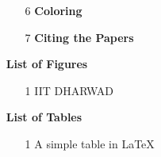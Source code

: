 \documentclass[12pt,a4paper]{article}
\begin{document}
\begin{itemize}
\begin{enumerate}
			\item[6] \textbf{Coloring} 
			\item[7] \textbf{Citing the Papers} 
		\end{enumerate}
		\item[] \textbf{List of Figures}
		\begin{enumerate}
			\item[1] IIT DHARWAD 
		\end{enumerate}
		\item[] \textbf{List of Tables}
		\begin{enumerate}
			\item[1] A simple table in LaTeX 
		\end{enumerate}
	\end{itemize}
	\pagebreak
	
\end{document}
